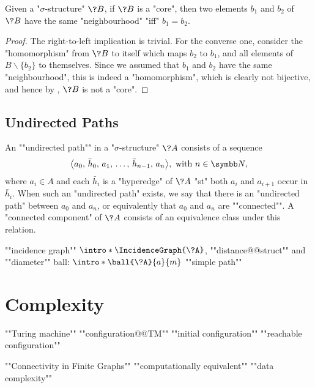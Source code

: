 \begin{proposition}
	\AP\label{prop:neighbourhood-core}
	Given a "$\sigma$-structure" $\?B$, if $\?B$ is a "core", then
	two elements $b_1$ and $b_2$ of $\?B$ have the same "neighbourhood" "iff" $b_1 = b_2$.
\end{proposition}

\begin{proof}
	The right-to-left implication is trivial.
	For the converse one, consider the "homomorphism" from $\?B$ to itself
	which maps $b_2$ to $b_1$, and all elements of $B \smallsetminus \{b_2\}$
	to themselves. Since we assumed that $b_1$ and $b_2$ have the same "neighbourhood",
	this is indeed a "homomorphism", which is clearly not bijective, and
	hence by , $\?B$ is not a "core".
\end{proof}

\subsection{Undirected Paths}

An \AP""undirected path"" in a "$\sigma$-structure" $\?A$ consists of a sequence
\[\big\langle a_0,\, \bar h_0,\, a_1,\, \hdots,\, \bar h_{n-1},\, a_n\big\rangle, \text{ with } n \in \N,\]
where $a_i \in A$ and each $\bar h_i$ is a "hyperedge" of $\?A$ "st" both
$a_i$ and $a_{i+1}$ occur in $\bar h_i$. When such an "undirected path" exists, we say that
there is an "undirected path" between $a_0$ and $a_n$, or equivalently
that $a_0$ and $a_n$ are \AP""connected"".%
A \AP"connected component" of $\?A$ consists of an equivalence class under this relation.

\begin{itemize}
	\itemAP ""incidence graph"" $\intro*\IncidenceGraph{\?A}$, ""distance@@struct"" and ""diameter""
	\itemAP ball: $\intro*\ball{\?A}{a}{m}$
	\itemAP ""simple path""
\end{itemize}

\section{Complexity}

\begin{itemize}
	\itemAP ""Turing machine""
	\itemAP ""configuration@@TM""
	\itemAP ""initial configuration""
	\itemAP ""reachable configuration""
\end{itemize}

\begin{itemize}
	\itemAP ""Connectivity in Finite Graphs""
	\itemAP ""computationally equivalent""
	\itemAP ""data complexity""
\end{itemize}